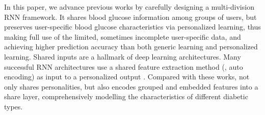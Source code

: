 \textcolor[rgb]{1.00,0.00,0.00}{In this paper, we advance previous works by carefully designing a multi-division RNN framework. It shares blood glucose information among groups of users, but preserves user-specific blood glucose characteristics via personalized learning, thus making full use of the limited, sometimes incomplete user-specific data, and achieving higher prediction accuracy than both generic learning and personalized learning. Shared inputs are a hallmark of deep learning architectures. Many successful RNN architectures use a shared feature extraction method (\eg, auto encoding) as input to a personalized output \cite{bib:lane2015deepear}. Compared with these works, \modelname not only shares personalities, but also encodes grouped and embedded features into a share layer, comprehensively modelling the characteristics of different diabetic types.  }



